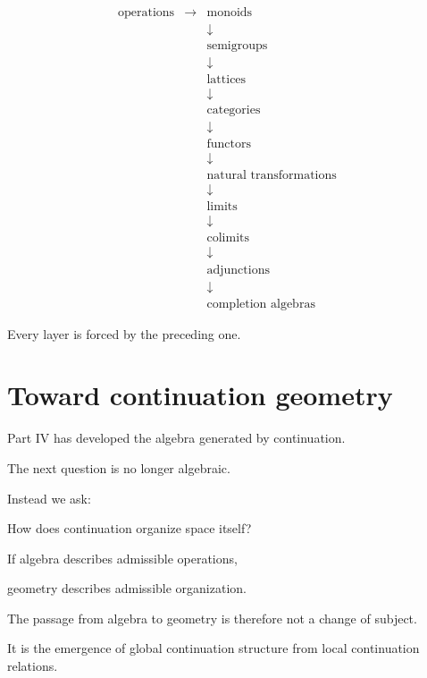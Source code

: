 \documentclass[13pt,openany]{book}
\theoremstyle{plain}
\theoremstyle{definition}
\begin{document}
\[
\begin{array}{cccc}
\text{operations}
&
\longrightarrow
&
\text{monoids}
&
\\
&
&
\downarrow
&
\\
&
&
\text{semigroups}
&
\\
&
&
\downarrow
&
\\
&
&
\text{lattices}
&
\\
&
&
\downarrow
&
\\
&
&
\text{categories}
&
\\
&
&
\downarrow
&
\\
&
&
\text{functors}
&
\\
&
&
\downarrow
&
\\
&
&
\text{natural transformations}
&
\\
&
&
\downarrow
&
\\
&
&
\text{limits}
&
\\
&
&
\downarrow
&
\\
&
&
\text{colimits}
&
\\
&
&
\downarrow
&
\\
&
&
\text{adjunctions}
&
\\
&
&
\downarrow
&
\\
&
&
\boxed{\text{completion algebras}}
\end{array}
\]

Every layer is forced by the preceding one.

\section{Toward continuation geometry}

Part IV has developed the algebra generated by continuation.

The next question is no longer algebraic.

Instead we ask:

How does continuation organize space itself?

If algebra describes admissible operations,

geometry describes admissible organization.

The passage from algebra to geometry is therefore not a change of subject.

It is the emergence of global continuation structure from local continuation
relations.
\end{document}
